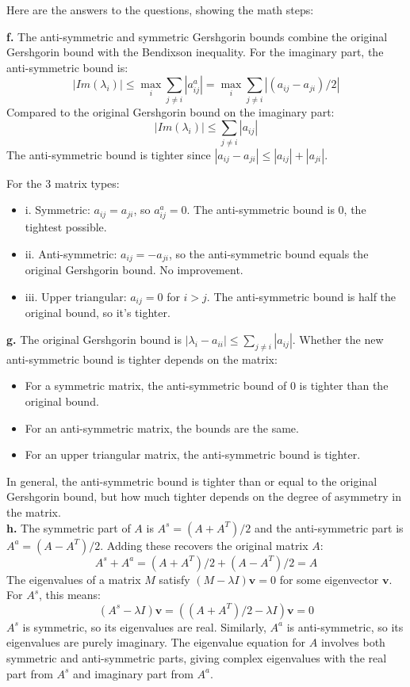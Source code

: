 \documentclass{article}
\begin{document}
Here are the answers to the questions, showing the math steps:

\textbf{f.} The anti-symmetric and symmetric Gershgorin bounds combine the original Gershgorin bound with the Bendixson inequality. For the imaginary part, the anti-symmetric bound is:
$$ |Im(\lambda_i)| \leq \max_i \sum_{j \neq i} |a_{ij}^a| = \max_i \sum_{j \neq i} |(a_{ij} - a_{ji})/2| $$
Compared to the original Gershgorin bound on the imaginary part:
$$ |Im(\lambda_i)| \leq \sum_{j \neq i} |a_{ij}| $$
The anti-symmetric bound is tighter since $|a_{ij} - a_{ji}| \leq |a_{ij}| + |a_{ji}|$.

For the 3 matrix types:
\begin{itemize}
    \item i. Symmetric: $a_{ij} = a_{ji}$, so $a_{ij}^a = 0$. The anti-symmetric bound is 0, the tightest possible.
    \item ii. Anti-symmetric: $a_{ij} = -a_{ji}$, so the anti-symmetric bound equals the original Gershgorin bound. No improvement.
    \item iii. Upper triangular: $a_{ij} = 0$ for $i > j$. The anti-symmetric bound is half the original bound, so it's tighter.
\end{itemize}

\textbf{g.} The original Gershgorin bound is $|\lambda_i - a_{ii}| \leq \sum_{j \neq i} |a_{ij}|$. Whether the new anti-symmetric bound is tighter depends on the matrix:

\begin{itemize}
    \item For a symmetric matrix, the anti-symmetric bound of 0 is tighter than the original bound.
    \item For an anti-symmetric matrix, the bounds are the same.
    \item For an upper triangular matrix, the anti-symmetric bound is tighter.
\end{itemize}

In general, the anti-symmetric bound is tighter than or equal to the original Gershgorin bound, but how much tighter depends on the degree of asymmetry in the matrix.\\

\textbf{h.} The symmetric part of $A$ is $A^s = (A + A^T)/2$ and the anti-symmetric part is $A^a = (A - A^T)/2$. Adding these recovers the original matrix $A$:
$$ A^s + A^a = (A + A^T)/2 + (A - A^T)/2 = A $$
The eigenvalues of a matrix $M$ satisfy $(M - \lambda I)\mathbf{v} = 0$ for some eigenvector $\mathbf{v}$. For $A^s$, this means:
$$ (A^s - \lambda I)\mathbf{v} = ((A + A^T)/2 - \lambda I)\mathbf{v} = 0 $$
$A^s$ is symmetric, so its eigenvalues are real. Similarly, $A^a$ is anti-symmetric, so its eigenvalues are purely imaginary. The eigenvalue equation for $A$ involves both symmetric and anti-symmetric parts, giving complex eigenvalues with the real part from $A^s$ and imaginary part from $A^a$.\\
\end{document}
